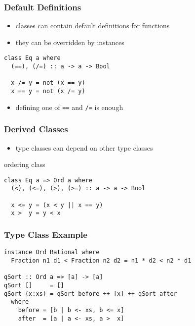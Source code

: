 \documentclass[dvipsnames]{beamer}
\theoremstyle{plain}
\begin{document}
\begin{frame}[fragile]
  \frametitle{Default Definitions}

  \begin{itemize}
    \item classes can contain default definitions for functions
    \item they can be overridden by instances
  \end{itemize}

  \begin{exampleblock}{}
    \begin{lstlisting}
class Eq a where
  (==), (/=) :: a -> a -> Bool

  x /= y = not (x == y)
  x == y = not (x /= y)
    \end{lstlisting}
  \end{exampleblock}

  \begin{itemize}
    \item defining one of \lstinline|==| and \lstinline|/=| is enough
  \end{itemize}
\end{frame}

\begin{frame}[fragile]
  \frametitle{Derived Classes}

  \begin{itemize}
    \item type classes can depend on other type classes
  \end{itemize}

  \begin{exampleblock}{ordering class}
    \begin{lstlisting}
class Eq a => Ord a where
  (<), (<=), (>), (>=) :: a -> a -> Bool

  x <= y = (x < y || x == y)
  x >  y = y < x
    \end{lstlisting}
  \end{exampleblock}
\end{frame}

\begin{frame}[fragile]
  \frametitle{Type Class Example}

  \begin{lstlisting}
instance Ord Rational where
  Fraction n1 d1 < Fraction n2 d2 = n1 * d2 < n2 * d1

qSort :: Ord a => [a] -> [a]
qSort []     = []
qSort (x:xs) = qSort before ++ [x] ++ qSort after
  where
    before = [b | b <- xs, b <= x]
    after  = [a | a <- xs, a >  x]
  \end{lstlisting}
\end{frame}
\end{document}
